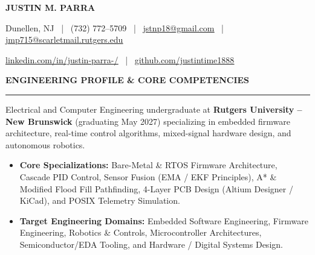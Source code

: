 \documentclass[10pt]{article}
\newcommand{\ulink}[2]{\href{#1}{\underline{#2}}}
\newcommand{\Section}[1]{%
  \vspace{4.5pt}%
  \textbf{\MakeUppercase{#1}}\par\vspace{-3.5pt}%
  \rule{\linewidth}{0.55pt}\par\vspace{2.5pt}%
}
\begin{document}

\begin{center}
  {\LARGE \textbf{JUSTIN M. PARRA}}\par\vspace{2.0pt}
  {\small
  Dunellen, NJ ~|~ (732) 772--5709 ~|~
  \ulink{mailto:jstnp18@gmail.com}{jstnp18@gmail.com} ~|~
  \ulink{mailto:jmp715@scarletmail.rutgers.edu}{jmp715@scarletmail.rutgers.edu}\par\vspace{1.5pt}
  \ulink{https://www.linkedin.com/in/justin-parra-/}{linkedin.com/in/justin-parra-/} ~|~
  \ulink{https://github.com/justintime1888}{github.com/justintime1888}
  }
\end{center}
\vspace{-4pt}

\Section{Engineering Profile \& Core Competencies}
Electrical and Computer Engineering undergraduate at \textbf{Rutgers University -- New Brunswick} (graduating May 2027) specializing in embedded firmware architecture, real-time control algorithms, mixed-signal hardware design, and autonomous robotics.
\begin{itemize}[leftmargin=0.15in, label={}, itemsep=1.0pt, topsep=1.2pt]
  \item \textbf{Core Specializations:} Bare-Metal \& RTOS Firmware Architecture, Cascade PID Control, Sensor Fusion (EMA / EKF Principles), A* \& Modified Flood Fill Pathfinding, 4-Layer PCB Design (Altium Designer / KiCad), and POSIX Telemetry Simulation.
  \item \textbf{Target Engineering Domains:} Embedded Software Engineering, Firmware Engineering, Robotics \& Controls, Microcontroller Architectures, Semiconductor/EDA Tooling, and Hardware / Digital Systems Design.
\end{itemize}
\end{document}
